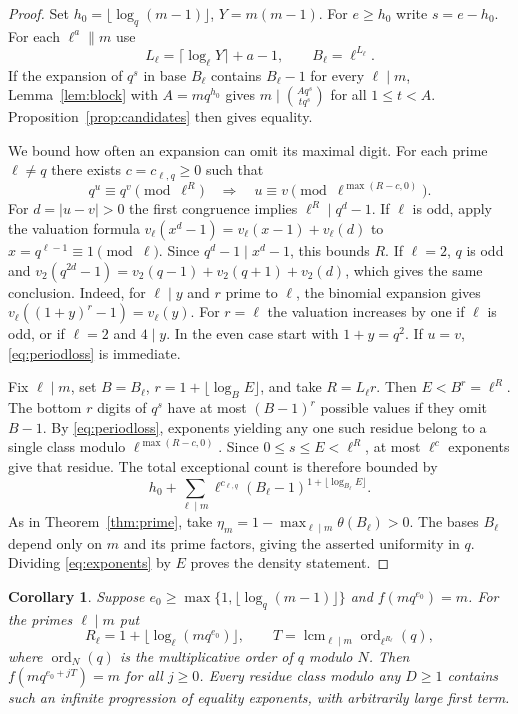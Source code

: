 \documentclass[a4paper,11pt]{article}
\newtheorem{corollary}[theorem]{Corollary}
\newcommand{\ord}{\operatorname{ord}}
\newcommand{\lcm}{\operatorname{lcm}}
\begin{document}
\begin{proof}
Set \(h_0=\lfloor\log_q(m-1)\rfloor\), \(Y=m(m-1)\). For \(e\ge h_0\)
write \(s=e-h_0\). For each \(\ell^a\parallel m\) use
\[
 L_\ell=\lceil\log_\ell Y\rceil+a-1,\qquad B_\ell=\ell^{L_\ell}.
\]
If the expansion of \(q^s\) in base \(B_\ell\) contains \(B_\ell-1\)
for every \(\ell\mid m\), Lemma~\ref{lem:block} with \(A=mq^{h_0}\)
gives \(m\mid\binom{Aq^s}{tq^s}\) for all \(1\le t<A\).
Proposition~\ref{prop:candidates} then gives equality.

We bound how often an expansion can omit its maximal digit. For each
prime \(\ell\ne q\) there exists \(c=c_{\ell,q}\ge0\) such that
\begin{equation}\label{eq:periodloss}
 q^u\equiv q^v\pmod{\ell^R}
 \quad\Longrightarrow\quad
 u\equiv v\pmod{\ell^{\max(R-c,0)}} .
\end{equation}
For \(d=|u-v|>0\) the first congruence implies \(\ell^R\mid q^d-1\).
If \(\ell\) is odd, apply the valuation formula
\(v_\ell(x^d-1)=v_\ell(x-1)+v_\ell(d)\) to \(x=q^{\ell-1}\equiv1\pmod\ell\).
Since \(q^d-1\mid x^d-1\), this bounds \(R\).
If \(\ell=2\), \(q\) is odd and
\(v_2(q^{2d}-1)=v_2(q-1)+v_2(q+1)+v_2(d)\), which gives the same
conclusion. Indeed, for \(\ell\mid y\) and \(r\) prime to \(\ell\), the
binomial expansion gives \(v_\ell((1+y)^r-1)=v_\ell(y)\). For \(r=\ell\)
the valuation increases by one if \(\ell\) is odd, or if \(\ell=2\)
and \(4\mid y\). In the even case start with \(1+y=q^2\).
If \(u=v\), \eqref{eq:periodloss} is immediate.

Fix \(\ell\mid m\), set \(B=B_\ell\), \(r=1+\lfloor\log_B E\rfloor\),
and take \(R=L_\ell r\). Then \(E<B^r=\ell^R\).
The bottom \(r\) digits of \(q^s\) have at most \((B-1)^r\) possible
values if they omit \(B-1\). By \eqref{eq:periodloss}, exponents
yielding any one such residue belong to a single class modulo
\(\ell^{\max(R-c,0)}\). Since \(0\le s\le E<\ell^R\), at most
\(\ell^c\) exponents give that residue. The total exceptional count is
therefore bounded by
\[
 h_0+\sum_{\ell\mid m}\ell^{c_{\ell,q}}
      (B_\ell-1)^{1+\lfloor\log_{B_\ell} E\rfloor}.
\]
As in Theorem~\ref{thm:prime}, take
\(\eta_m=1-\max_{\ell\mid m}\theta(B_\ell)>0\). The bases \(B_\ell\)
depend only on \(m\) and its prime factors, giving the asserted uniformity
in \(q\). Dividing \eqref{eq:exponents} by \(E\) proves the density statement.
\end{proof}

\begin{corollary}\label{cor:progression}
Suppose \(e_0\ge\max\{1,\lfloor\log_q(m-1)\rfloor\}\) and \(f(mq^{e_0})=m\).
For the primes \(\ell\mid m\) put
\[
 R_\ell=1+\lfloor\log_\ell(mq^{e_0})\rfloor,\qquad
 T=\lcm_{\ell\mid m}\ord_{\ell^{R_\ell}}(q),
\]
where \(\ord_N(q)\) is the multiplicative order of \(q\) modulo \(N\).
Then \(f(mq^{e_0+jT})=m\) for all \(j\ge0\). Every residue class modulo
any \(D\ge1\) contains such an infinite progression of equality exponents,
with arbitrarily large first term.
\end{corollary}
\end{document}
